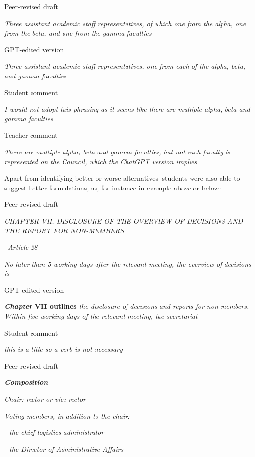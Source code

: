 \documentclass[output=paper]{langscibook}
\begin{document}
\ea%
    \label{ex:10:9}
    \ea  Peer-revised draft

    \textit{Three assistant academic staff representatives, of which one from the alpha, one from the beta, and one from the gamma faculties}

    \ex  GPT-edited version

    \textit{Three assistant academic staff representatives, one from each of the alpha, beta, and gamma faculties}

    \ex   Student comment

    \textit{I would not adopt this phrasing as it seems like there are multiple alpha, beta and gamma faculties}

    \ex   Teacher comment

    \textit{There are multiple alpha, beta and gamma faculties, but not each faculty is represented on the Council, which the ChatGPT version implies}
    \z
\z

Apart from identifying better or worse alternatives, students were also able to suggest better formulations, as, for instance in example  above or  below:

\ea%
    \label{ex:10:10}
    \ea  Peer-revised draft

    \textit{CHAPTER VII. DISCLOSURE OF THE OVERVIEW OF DECISIONS AND THE REPORT FOR NON-MEMBERS~}

    \textit{~Article 28~}

    \textit{No later than 5 working days after the relevant meeting, the overview of decisions is}

    \ex  GPT-edited version

    \textbf{\textit{Chapter} \textbf{VII} \textbf{outlines}} \textit{the disclosure of decisions and reports for non-members. Within five working days of the relevant meeting, the secretariat}

    \ex   Student comment

    \textit{this is a title so a verb is not necessary}
    \z
\z

\ea%
    \label{ex:10:11}
    \ea  Peer-revised draft

    \textbf{\textit{Composition}}

    \textit{Chair: rector or vice-rector}

    \textit{Voting members, in addition to the chair:}

    \textit{{}- the chief logistics administrator}

    \textit{{}- the Director of Administrative Affairs}
\end{document}
